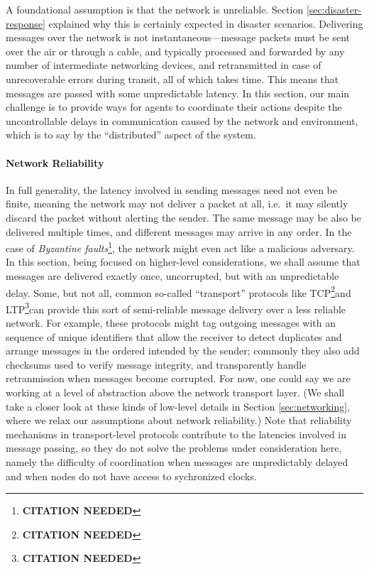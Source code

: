 \documentclass[]             %
{NASA}                       %
\theoremstyle{definition}
\newcommand{\citationneeded}{\footnote{\textbf{CITATION NEEDED}}}
\begin{document}
A foundational assumption is that the network is unreliable. Section
\ref{sec:disaster-response} explained why this is certainly expected
in disaster scenarios. Delivering messages over the network is not
instantaneous---message packets must be sent over the air or through a
cable, and typically processed and forwarded by any number of
intermediate networking devices, and retransmitted in case of
unrecoverable errors during transit, all of which takes time. This
means that messages are passed with some unpredictable latency. In
this section, our main challenge is to provide ways for agents to
coordinate their actions despite the uncontrollable delays in
communication caused by the network and environment, which is to say
by the ``distributed'' aspect of the system.

\paragraph{Network Reliability}
In full generality, the latency involved in sending messages need not
even be finite, meaning the network may not deliver a packet at all,
i.e.~it may silently discard the packet without alerting the
sender. The same message may be also be delivered multiple times, and
different messages may arrive in any order. In the case of
\emph{Byzantine faults}\citationneeded, the network might even act
like a malicious adversary. In this section, being focused on
higher-level considerations, we shall assume that messages are
delivered exactly once, uncorrupted, but with an unpredictable
delay. Some, but not all, common so-called ``transport'' protocols
like TCP\citationneeded and LTP\citationneeded can provide this sort
of semi-reliable message delivery over a less reliable network. For
example, these protocols might tag outgoing messages with an sequence
of unique identifiers that allow the receiver to detect duplicates and
arrange messages in the ordered intended by the sender; commonly they
also add checksums used to verify message integrity, and transparently
handle retranmission when messages become corrupted. For now, one
could say we are working at a level of abstraction above the network
transport layer. (We shall take a closer look at these kinds of
low-level details in Section \ref{sec:networking}, where we relax our
assumptions about network reliability.) Note that reliability
mechanisms in transport-level protocols contribute to the latencies
involved in message passing, so they do not solve the problems under
consideration here, namely the difficulty of coordination when
messages are unpredictably delayed and when nodes do not have access
to sychronized clocks.
\end{document}
